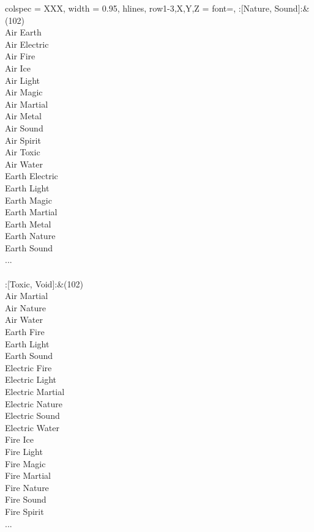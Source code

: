 \begin{longtblr}[
	caption = {2v2 Attacking Effective},
	label = {2v2-Attacking-Effective},
]{
	colspec = {XXX}, width = 0.95\linewidth,
	hlines,
	row{1-3,X,Y,Z} = {font=\bfseries},
}
	:[Nature, Sound]:&{(102)\\
	Air Earth \\
	Air Electric \\
	Air Fire \\
	Air Ice \\
	Air Light \\
	Air Magic \\
	Air Martial \\
	Air Metal \\
	Air Sound \\
	Air Spirit \\
	Air Toxic \\
	Air Water \\
	Earth Electric \\
	Earth Light \\
	Earth Magic \\
	Earth Martial \\
	Earth Metal \\
	Earth Nature \\
	Earth Sound \\
	...\\
	}\\

	:[Toxic, Void]:&{(102)\\
	Air Martial \\
	Air Nature \\
	Air Water \\
	Earth Fire \\
	Earth Light \\
	Earth Sound \\
	Electric Fire \\
	Electric Light \\
	Electric Martial \\
	Electric Nature \\
	Electric Sound \\
	Electric Water \\
	Fire Ice \\
	Fire Light \\
	Fire Magic \\
	Fire Martial \\
	Fire Nature \\
	Fire Sound \\
	Fire Spirit \\
	...\\
	}\\


\end{longtblr}
